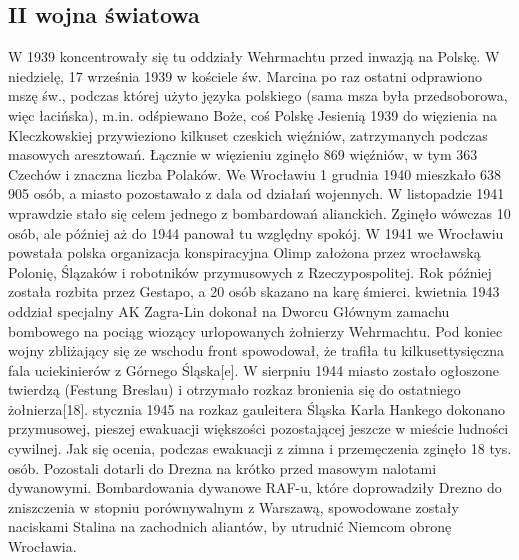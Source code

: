\documentclass{article}
\begin{document}
\subsection{II wojna światowa}
\vspace{3mm} %
\newline W 1939 koncentrowały się tu oddziały Wehrmachtu przed inwazją na Polskę.
\vspace{3mm} %
\newline W niedzielę, 17 września 1939 w kościele św. Marcina po raz ostatni odprawiono mszę św., podczas której użyto języka polskiego (sama msza była przedsoborowa, więc łacińska), m.in. odśpiewano Boże, coś Polskę
\vspace{3mm} %
\newline Jesienią 1939 do więzienia na Kleczkowskiej przywieziono kilkuset czeskich więźniów, zatrzymanych podczas masowych aresztowań. Łącznie w więzieniu zginęło 869 więźniów, w tym 363 Czechów i znaczna liczba Polaków.
\vspace{3mm} %
\newline We Wrocławiu 1 grudnia 1940 mieszkało 638 905 osób, a miasto pozostawało z dala od działań wojennych. W listopadzie 1941 wprawdzie stało się celem jednego z bombardowań alianckich. Zginęło wówczas 10 osób, ale później aż do 1944 panował tu względny spokój.
\vspace{3mm} %
\newline W 1941 we Wrocławiu powstała polska organizacja konspiracyjna Olimp założona przez wrocławską Polonię, Ślązaków i robotników przymusowych z Rzeczypospolitej. Rok później została rozbita przez Gestapo, a 20 osób skazano na karę śmierci.
\vspace{3mm} %
 kwietnia 1943 oddział specjalny AK Zagra-Lin dokonał na Dworcu Głównym zamachu bombowego na pociąg wiozący urlopowanych żołnierzy Wehrmachtu.
\vspace{3mm} %
\newline Pod koniec wojny zbliżający się ze wschodu front spowodował, że trafiła tu kilkusettysięczna fala uciekinierów z Górnego Śląska[e]. W sierpniu 1944 miasto zostało ogłoszone twierdzą (Festung Breslau) i otrzymało rozkaz bronienia się do ostatniego żołnierza[18].
\vspace{3mm} %
 stycznia 1945 na rozkaz gauleitera Śląska Karla Hankego dokonano przymusowej, pieszej ewakuacji większości pozostającej jeszcze w mieście ludności cywilnej. Jak się ocenia, podczas ewakuacji z zimna i przemęczenia zginęło 18 tys. osób. Pozostali dotarli do Drezna na krótko przed masowym nalotami dywanowymi. Bombardowania dywanowe RAF-u, które doprowadziły Drezno do zniszczenia w stopniu porównywalnym z Warszawą, spowodowane zostały naciskami Stalina na zachodnich aliantów, by utrudnić Niemcom obronę Wrocławia.
\end{document}

